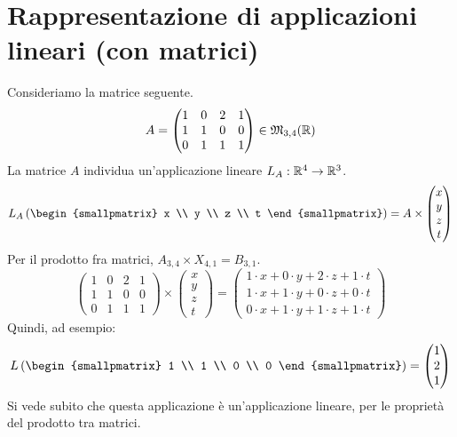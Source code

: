 \section{Rappresentazione di applicazioni lineari (con matrici)}
Consideriamo la matrice seguente.
\[
A =
\begin{pmatrix}
1 & 0 & 2 & 1 \\
1 & 1 & 0 & 0 \\
0 & 1 & 1 & 1
\end{pmatrix}
\in \mathfrak{M}_{3,4} (\mathbb{R})
\]
La matrice $A$ individua un'applicazione lineare $L_A : \mathbb{R}^4 \to \mathbb{R}^3$.
\[
L_A \left(
\begin{smallpmatrix}
x \\
y \\ 
z \\
t
\end{smallpmatrix}
\right) = A \times 
\begin{pmatrix}
x \\
y \\ 
z \\
t
\end{pmatrix}
\]
Per il prodotto fra matrici, $A_{3,4} \times X_{4,1} = B_{3,1}$.
\[
\begin{pmatrix}
1 & 0 & 2 & 1 \\
1 & 1 & 0 & 0 \\
0 & 1 & 1 & 1
\end{pmatrix}
\times 
\begin{pmatrix}
x \\
y \\ 
z \\
t
\end{pmatrix}
=
\begin{pmatrix}
1 \cdot x + 0 \cdot y + 2 \cdot z + 1 \cdot t \\
1 \cdot x + 1 \cdot y + 0 \cdot z + 0 \cdot t \\
0 \cdot x + 1 \cdot y + 1 \cdot z + 1 \cdot t
\end{pmatrix}
\]
Quindi, ad esempio:
\[
L \left(
\begin{smallpmatrix}
1 \\
1 \\
0 \\
0
\end{smallpmatrix}
\right) = 
\begin{pmatrix}
1 \\
2 \\
1
\end{pmatrix}
\]
Si vede subito che questa applicazione \`e un'applicazione lineare, per le propriet\`a del prodotto tra matrici.
